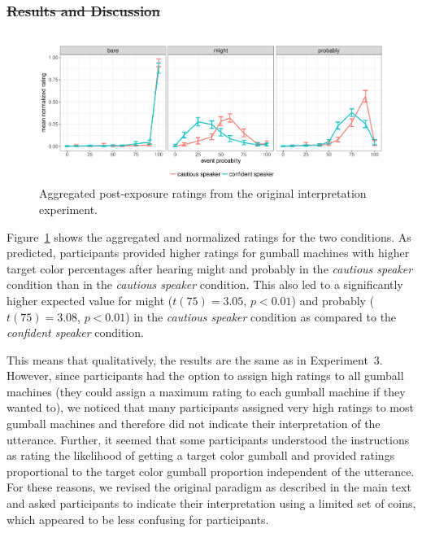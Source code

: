 \documentclass[man, floatsintext]{apa6}
\providecommand{\DIFadd}[1]{{\protect\color{blue}\uwave{#1}}} %
\providecommand{\DIFdel}[1]{{\protect\color{red}\sout{#1}}}                      %
\providecommand{\DIFaddbegin}{} %
\providecommand{\DIFaddend}{} %
\providecommand{\DIFdelbegin}{} %
\providecommand{\DIFdelend}{} %
\newcommand{\DIFscaledelfig}{0.5}
\newlength{\DIFdelgraphicswidth} %
\newlength{\DIFdelgraphicsheight} %
\newcommand{\DIFaddincludegraphics}[2][]{{\color{blue}\fbox{\DIFOincludegraphics[#1]{#2}}}} %
\newcommand{\DIFdelincludegraphics}[2][]{%
\sbox{\DIFdelgraphicsbox}{\DIFOincludegraphics[#1]{#2}}%
\settoboxwidth{\DIFdelgraphicswidth}{\DIFdelgraphicsbox} %
\settoboxtotalheight{\DIFdelgraphicsheight}{\DIFdelgraphicsbox} %
\scalebox{\DIFscaledelfig}{%
\parbox[b]{\DIFdelgraphicswidth}{\usebox{\DIFdelgraphicsbox}\\[-\baselineskip] \rule{\DIFdelgraphicswidth}{0em}}\llap{\resizebox{\DIFdelgraphicswidth}{\DIFdelgraphicsheight}{%
\setlength{\unitlength}{\DIFdelgraphicswidth}%
\begin{picture}(1,1)%
\thicklines\linethickness{2pt} %
{\color[rgb]{1,0,0}\put(0,0){\framebox(1,1){}}}%
{\color[rgb]{1,0,0}\put(0,0){\line( 1,1){1}}}%
{\color[rgb]{1,0,0}\put(0,1){\line(1,-1){1}}}%
\end{picture}%
}\hspace*{3pt}}} %
} %
\DeclareRobustCommand{\DIFaddbegin}{\DIFOaddbegin \let\includegraphics\DIFaddincludegraphics} %
\DeclareRobustCommand{\DIFaddend}{\DIFOaddend \let\includegraphics\DIFOincludegraphics} %
\DeclareRobustCommand{\DIFdelbegin}{\DIFOdelbegin \let\includegraphics\DIFdelincludegraphics} %
\DeclareRobustCommand{\DIFdelend}{\DIFOaddend \let\includegraphics\DIFOincludegraphics} %
\begin{document}
\DIFdelbegin \subsubsection*{\DIFdel{Results and Discussion}}
\DIFdelend \DIFaddbegin \subsection{\DIFadd{Results and Discussion}}
\DIFaddend 

\begin{figure}[h!]
\includegraphics[width=\textwidth]{plots/exp-2-ratings.pdf}
\caption{Aggregated post-exposure ratings from the original interpretation experiment.  \label{fig:adaptation-results-comp-orig}}
\end{figure}

Figure~\ref{fig:adaptation-results-comp-orig} shows the aggregated and normalized ratings for the two conditions.  As predicted, participants provided higher ratings for gumball machines with higher target color percentages after hearing {\sc might} and {\sc probably} in the \emph{cautious speaker} condition than in the \emph{cautious speaker} condition. This also led to a significantly higher expected value for {\sc might} ($t(75)=3.05$, $p<0.01$) and {\sc probably} ($t(75)=3.08$, $p<0.01$) in the \emph{cautious speaker} condition as compared to the \emph{confident speaker} condition.

This means that qualitatively, the results are the same as in Experiment~3. However, since participants had the option to assign high 
ratings to 
all gumball machines (they could assign a maximum rating to each gumball machine if they wanted to), we noticed that many participants assigned very high ratings to most gumball 
machines and therefore did not indicate their interpretation of the utterance. Further, it seemed that some participants
understood the instructions as rating the likelihood of getting a target color gumball and provided ratings proportional to the 
target color gumball proportion independent of the utterance. For these reasons, we revised the original paradigm as described
in the main text and asked participants to indicate their interpretation using a limited set of coins, which appeared to be less
confusing for participants. 
\end{document}
